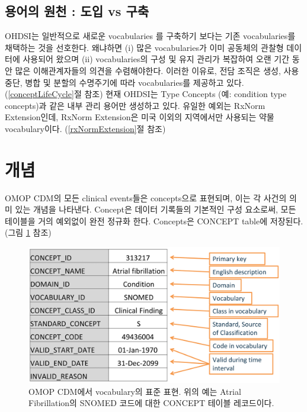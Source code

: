 \documentclass[11pt]{book}
\theoremstyle{definition}
\theoremstyle{definition}
\theoremstyle{definition}
\theoremstyle{remark}
\begin{document}
\subsection{용어의 원천 : 도입 vs 구축}\label{---vs-}

OHDSI는 일반적으로 새로운 vocabularies 를 구축하기 보다는 기존
vocabularies를 채택하는 것을 선호한다. 왜냐하면 (i) 많은 vocabularies가
이미 공동체의 관찰형 데이터에 사용되어 왔으며 (ii) vocabularies의 구성
및 유지 관리가 복잡하여 오랜 기간 동안 많은 이해관계자들의 의견을
수렴해야한다. 이러한 이유로, 전담 조직은 생성, 사용 중단, 병합 및 분할의
수명주기에 따라 vocabularies를 제공하고 있다. (\ref{conceptLifeCycle}절
참조) 현재 OHDSI는 Type Concepts (예: condition type concepts)과 같은
내부 관리 용어만 생성하고 있다. 유일한 예외는 RxNorm Extension인데,
RxNorm Extension은 미국 이외의 지역에서만 사용되는 약물 vocabulary이다.
(\ref{rxNormExtension}절 참조)

\section{개념}

OMOP CDM의 모든 clinical events들은 concepts으로 표현되며, 이는 각
사건의 의미 있는 개념을 나타낸다. Concept은 데이터 기록들의 기본적인
구성 요소로써, 모든 테이블을 거의 예외없이 완전 정규화 한다. Concepts은
CONCEPT table에 저장된다. (그림 \ref{fig:concept} 참조) 

\begin{figure}

{\centering \includegraphics[width=0.9\linewidth]{images/StandardizedVocabularies/concept} 

}

\caption{OMOP CDM에서 vocabulary의 표준 표현. 위의 예는 Atrial Fibrillation의 SNOMED 코드에 대한 CONCEPT 테이블 레코드이다.}\label{fig:concept}
\end{figure}
\end{document}
